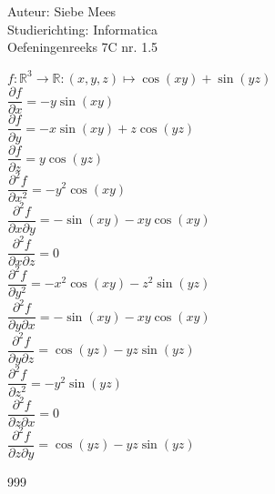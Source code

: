 \documentclass[a4paper]{article}
\begin{document}
  
\noindent \large Auteur: Siebe Mees \\
\noindent \large Studierichting: Informatica\\
\noindent \large Oefeningenreeks 7C nr. 1.5\\

\medskip

\normalsize

$f:\mathbb{R}^3 \rightarrow \mathbb{R}:(x,y,z) \mapsto \cos(xy)+\sin(yz)$\\

$\dfrac{\partial f}{\partial x}=-y\sin(xy)$\\

$\dfrac{\partial f}{\partial y}=-x\sin(xy)+z\cos(yz)$\\

$\dfrac{\partial f}{\partial z}=y\cos(yz)$\\

$\dfrac{\partial^2 f}{\partial x^2}=-y^2\cos(xy)$\\

$\dfrac{\partial^2 f}{\partial x \partial y}=-\sin(xy)-xy\cos(xy)$\\

$\dfrac{\partial^2 f}{\partial x \partial z}=0$\\

$\dfrac{\partial^2 f}{\partial y^2}=-x^2\cos(xy)-z^2\sin(yz)$\\

$\dfrac{\partial^2 f}{\partial y \partial x}=-\sin(xy)-xy\cos(xy)$\\

$\dfrac{\partial^2 f}{\partial y \partial z}=\cos(yz)-yz\sin(yz)$\\

$\dfrac{\partial^2 f}{\partial z^2}=-y^2\sin(yz)$\\

$\dfrac{\partial^2 f}{\partial z \partial x}=0$\\

$\dfrac{\partial^2 f}{\partial z \partial y}=\cos(yz)-yz\sin(yz)$\\

\begin{thebibliography}{999}
\end{thebibliography}
\end{document}
